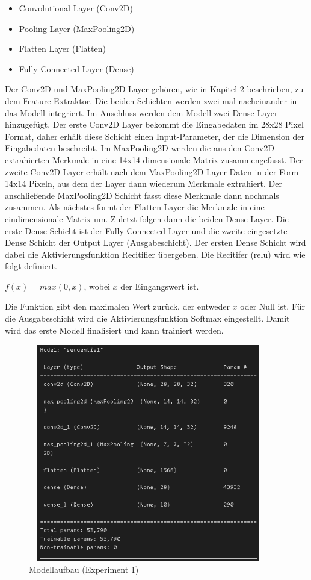 \documentclass[12pt]{scrreprt}
\begin{document}
\begin{itemize}
	\item Convolutional Layer (Conv2D)
	\item Pooling Layer (MaxPooling2D)
	\item Flatten Layer (Flatten)
	\item Fully-Connected Layer (Dense)
	\label{tab:model1}
\end{itemize}
	
Der Conv2D und MaxPooling2D Layer gehören, wie in Kapitel 2 beschrieben, zu dem Feature-Extraktor. Die beiden Schichten werden zwei mal nacheinander in das Modell integriert. Im Anschluss werden dem Modell zwei Dense Layer hinzugefügt. Der erste Conv2D Layer bekommt die Eingabedaten im 28x28 Pixel Format, daher erhält diese Schicht einen Input-Parameter, der die Dimension der Eingabedaten beschreibt. Im MaxPooling2D werden die aus den Conv2D extrahierten Merkmale in eine 14x14 dimensionale Matrix zusammengefasst. Der zweite Conv2D Layer erhält nach dem MaxPooling2D Layer Daten in der Form 14x14 Pixeln, aus dem der Layer dann wiederum Merkmale extrahiert. Der anschließende MaxPooling2D Schicht fasst diese Merkmale dann nochmals zusammen. Als nächstes formt der Flatten Layer die Merkmale in eine eindimensionale Matrix um. Zuletzt folgen dann die beiden Dense Layer. Die erste Dense Schicht ist der Fully-Connected Layer und die zweite eingesetzte Dense Schicht der Output Layer (Ausgabeschicht). Der ersten Dense Schicht wird dabei die Aktivierungsfunktion Recitifier übergeben. Die Recitifer (relu) wird wie folgt definiert.
	
\begin{center}
	$f(x) = max(0,x)$, wobei $x$ der Eingangswert ist.
\end{center}

Die Funktion gibt den maximalen Wert zurück, der entweder $x$ oder Null ist. Für die Ausgabeschicht wird die Aktivierungsfunktion Softmax eingestellt. Damit wird das erste Modell finalisiert und kann trainiert werden.
	
\begin{figure}[h!]
	\centering
	\includegraphics[width=10.5cm, height=9.5cm]		{ExperimentModelAufbau_1.png}
	\caption{  Modellaufbau \cite{HK22} (Experiment 1)}
	\label{fig:fig13}
\end{figure}
	
\end{document}

